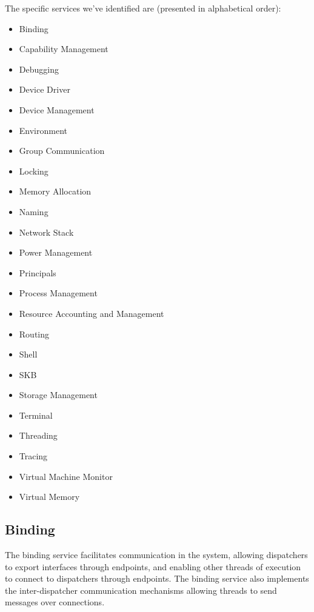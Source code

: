 \documentclass[a4paper,twoside]{report} %
\begin{document}
The specific services we've identified are (presented in alphabetical order):

\begin{itemize}
  \item Binding
  \item Capability Management
  \item Debugging
  \item Device Driver
  \item Device Management
  \item Environment
  \item Group Communication
  \item Locking
  \item Memory Allocation
  \item Naming
  \item Network Stack
  \item Power Management
  \item Principals
  \item Process Management
  \item Resource Accounting and Management
  \item Routing
  \item Shell
  \item SKB
  \item Storage Management
  \item Terminal
  \item Threading
  \item Tracing
  \item Virtual Machine Monitor
  \item Virtual Memory
\end{itemize}

\subsection{Binding}


The binding service facilitates communication in the system, allowing
dispatchers to export interfaces through endpoints, and enabling other
threads of execution to connect to dispatchers through endpoints.
The binding service also implements the inter-dispatcher communication
mechanisms allowing threads to send messages over connections.

\end{document}
